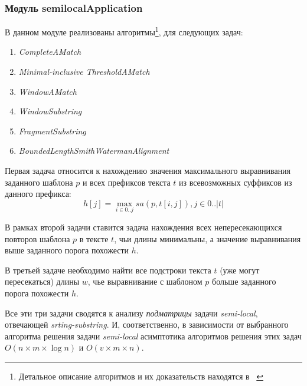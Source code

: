 






\subsubsection{Модуль semilocalApplication}
В данном модуле реализованы алгоритмы\footnote{Детальное описание алгоритмов и их доказательств находятся в ~\cite{tiskin2006all}}, для следующих задач:
\begin{enumerate}
    \item \emph{CompleteAMatch}
    \item \emph{Minimal-inclusive ThresholdAMatch}
    \item \emph{WindowAMatch}
    \item \emph{WindowSubstring}
    \item \emph{FragmentSubstring}
    \item \emph{BoundedLengthSmithWatermanAlignment}
\end{enumerate}

Первая задача относится к нахождению значения максимального выравнивания заданного шаблона $p$ и всех префиксов текста $t$ из всевозможных суффиксов из данного префикса:
\begin{equation}
    h[j] = \max _{i \in 0 ..j} sa(p,t[i,j]), j \in 0..|t|
\end{equation}

В рамках второй задачи ставится задача нахождения всех непересекающихся повторов шаблона $p$ в тексте $t$, чьи длины минимальны, а значение выравнивания выше заданного порога похожести $h$.

В третьей задаче необходимо найти все подстроки текста $t$ (уже могут пересекаться) длины $w$, чье выравнивание с шаблоном $p$ больше заданного порога похожести $h$.

Все эти три задачи сводятся к анализу \emph{подматрицы} задачи 
\emph{semi-local}, отвечающей \emph{srting-substring}.
И, соответственно, в зависимости от выбранного алгоритма решения задачи \emph{semi-local} асимптотика алгоритмов решения этих задач $O(n \times m \times \log n)$ и $O(v \times  m \times n)$.


